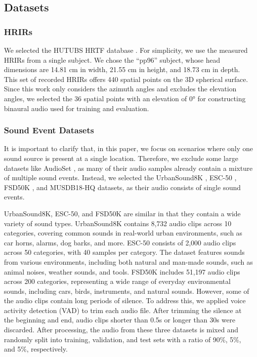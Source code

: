 \documentclass{IEEEtran}
\begin{document}
\subsection{Datasets}

\subsubsection{HRIRs}
We selected the HUTUBS HRTF database \cite{brinkmann2019hutubs}. For simplicity, we use the measured HRIRs from a single subject. We chose the ``pp96'' subject, whose head dimensions are 14.81 cm in width, 21.55 cm in height, and 18.73 cm in depth. This set of recorded HRIRs offers 440 spatial points on the 3D spherical surface. Since this work only considers the azimuth angles and excludes the elevation angles, we selected the 36 spatial points with an elevation of 0° for constructing binaural audio used for training and evaluation.

\subsubsection{Sound Event Datasets}
It is important to clarify that, in this paper, we focus on scenarios where only one sound source is present at a single location. Therefore, we exclude some large datasets like AudioSet \cite{gemmeke2017audio}, as many of their audio samples already contain a mixture of multiple sound events. Instead, we selected the UrbanSound8K \cite{salamon2014dataset}, ESC-50 \cite{piczak2015esc}, FSD50K \cite{fonseca2021fsd50k}, and MUSDB18-HQ \cite{rafii2019musdb18} datasets, as their audio consists of single sound events.

UrbanSound8K, ESC-50, and FSD50K are similar in that they contain a wide variety of sound types. UrbanSound8K contains 8,732 audio clips across 10 categories, covering common sounds in real-world urban environments, such as car horns, alarms, dog barks, and more. ESC-50 consists of 2,000 audio clips across 50 categories, with 40 samples per category. The dataset features sounds from various environments, including both natural and man-made sounds, such as animal noises, weather sounds, and tools. FSD50K includes 51,197 audio clips across 200 categories, representing a wide range of everyday environmental sounds, including cars, birds, instruments, and natural sounds. However, some of the audio clips contain long periods of silence. To address this, we applied voice activity detection (VAD) \cite{hwang2023torchaudio} to trim each audio file. After trimming the silence at the beginning and end, audio clips shorter than 0.5s or longer than 30s were discarded. After processing, the audio from these three datasets is mixed and randomly split into training, validation, and test sets with a ratio of 90\%, 5\%, and 5\%, respectively.
\end{document}
